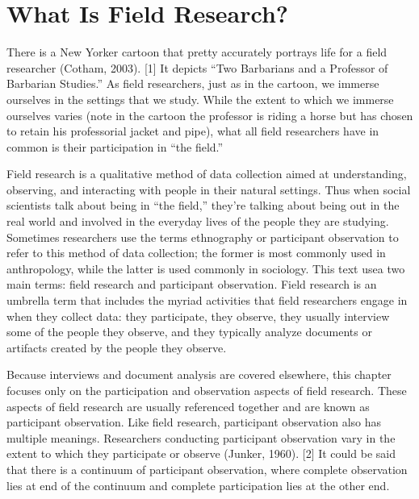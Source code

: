 \section{What Is Field Research?}

There is a New Yorker cartoon that pretty accurately portrays life for a field researcher (Cotham, 2003). [1] It depicts ``Two Barbarians and a Professor of Barbarian Studies.'' As field researchers, just as in the cartoon, we immerse ourselves in the settings that we study. While the extent to which we immerse ourselves varies (note in the cartoon the professor is riding a horse but has chosen to retain his professorial jacket and pipe), what all field researchers have in common is their participation in ``the field.''

Field research is a qualitative method of data collection aimed at understanding, observing, and interacting with people in their natural settings. Thus when social scientists talk about being in ``the field,'' they’re talking about being out in the real world and involved in the everyday lives of the people they are studying. Sometimes researchers use the terms ethnography or participant observation to refer to this method of data collection; the former is most commonly used in anthropology, while the latter is used commonly in sociology. This text usea two main terms: field research and participant observation. Field research is an umbrella term that includes the myriad activities that field researchers engage in when they collect data: they participate, they observe, they usually interview some of the people they observe, and they typically analyze documents or artifacts created by the people they observe.

Because interviews and document analysis are covered elsewhere, this chapter focuses only on the participation and observation aspects of field research. These aspects of field research are usually referenced together and are known as participant observation. Like field research, participant observation also has multiple meanings. Researchers conducting participant observation vary in the extent to which they participate or observe (Junker, 1960). [2] It could be said that there is a continuum of participant observation, where complete observation lies at end of the continuum and complete participation lies at the other end.

